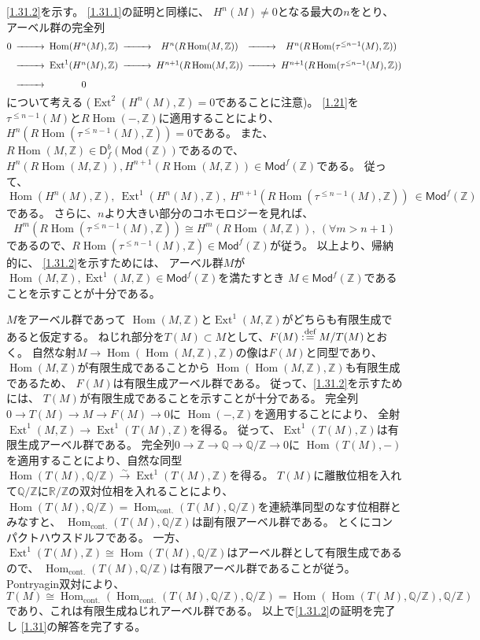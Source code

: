 \documentclass[uplatex,dvipdfmx]{jsarticle}
\makeatletter
\theoremstyle{definition}
\renewenvironment{proof}[1][\proofname]{
  \pushQED{\qed}%
  \normalfont \topsep6\p@\@plus6\p@\relax
  \trivlist
  \item[\hskip\labelsep
    #1\@addpunct{\textbf{.}}]\ignorespaces
}{%
  \popQED\endtrivlist\@endpefalse
}
\providecommand{\proofname}{証明}
\DeclareMathOperator{\Hom}{\mathrm{Hom}}
\DeclareMathOperator{\Ext}{\mathrm{Ext}}
\newcommand{\Mod}{\mathsf{Mod}}
\newcommand{\sfD}{\mathsf{D}}
\newcommand\R{\mathbb{R}}
\newcommand\Q{\mathbb{Q}}
\newcommand\Z{\mathbb{Z}}
\def\dfn{:\overset{\mbox{{\scriptsize def}}}{=}}
\makeatother
\begin{document}
\begin{proof}
  \ref{1.31.2}を示す。
  \ref{1.31.1}の証明と同様に、
  \(H^n(M) \neq 0\)となる最大の\(n\)をとり、
  アーベル群の完全列
  \[
  \begin{CD}
    0 @>>> \Hom(H^n(M),\Z) @>>> H^n(R\Hom(M,\Z))
    @>>> H^n(R\Hom(\tau^{\leq n-1}(M),\Z)) \\
    @>>> \Ext^1(H^n(M),\Z) @>>> H^{n+1}(R\Hom(M,\Z)) @>>>
    H^{n+1}(R\Hom(\tau^{\leq n-1}(M),\Z)) \\
    @>>> 0 @. @.
  \end{CD}
  \]
  について考える
  (\(\Ext^2(H^n(M),\Z)=0\)であることに注意)。
  \autoref{1.21}を\(\tau^{\leq n-1}(M)\)と\(R\Hom(-,\Z)\)に適用することにより、
  \(H^n(R\Hom(\tau^{\leq n-1}(M),\Z)) = 0\)である。
  また、\(R\Hom(M,\Z)\in \sfD_f^b(\Mod(\Z))\)であるので、
  \(H^n(R\Hom(M,\Z)), H^{n+1}(R\Hom(M,\Z))\in \Mod^f(\Z)\)である。
  従って、
  \[\Hom(H^n(M),\Z), \ \Ext^1(H^n(M),\Z), \
  H^{n+1}(R\Hom(\tau^{\leq n-1}(M),\Z)) \ \in \Mod^f(\Z)\]
  である。
  さらに、\(n\)より大きい部分のコホモロジーを見れば、
  \[H^m(R\Hom(\tau^{\leq n-1}(M),\Z))\cong H^m(R\Hom(M,\Z)), \ (\forall m > n+1)\]
  であるので、\(R\Hom(\tau^{\leq n-1}(M),\Z)\in \Mod^f(\Z)\)が従う。
  以上より、帰納的に、
  \ref{1.31.2}を示すためには、
  アーベル群\(M\)が\(\Hom(M,\Z),\Ext^1(M,\Z)\in \Mod^f(\Z)\)を満たすとき
  \(M\in \Mod^f(\Z)\)であることを示すことが十分である。

  \(M\)をアーベル群であって
  \(\Hom(M,\Z)\)と\(\Ext^1(M,\Z)\)がどちらも有限生成であると仮定する。
  ねじれ部分を\(T(M)\subset M\)として、\(F(M)\dfn M/T(M)\)とおく。
  自然な射\(M\to \Hom(\Hom(M,\Z),\Z)\)の像は\(F(M)\)と同型であり、
  \(\Hom(M,\Z)\)が有限生成であることから
  \(\Hom(\Hom(M,\Z),\Z)\)も有限生成であるため、
  \(F(M)\)は有限生成アーベル群である。
  従って、\ref{1.31.2}を示すためには、
  \(T(M)\)が有限生成であることを示すことが十分である。
  完全列
  \(0\to T(M)\to M\to F(M)\to 0\)に
  \(\Hom(-,\Z)\)を適用することにより、
  全射\(\Ext^1(M,\Z)\to \Ext^1(T(M),\Z)\)を得る。
  従って、\(\Ext^1(T(M),\Z)\)は有限生成アーベル群である。
  完全列\(0\to \Z\to \Q\to \Q/\Z\to 0\)に
  \(\Hom(T(M),-)\)を適用することにより、自然な同型
  \(\Hom(T(M),\Q/\Z)\xrightarrow{\sim}\Ext^1(T(M),\Z)\)を得る。
  \(T(M)\)に離散位相を入れて\(\Q/\Z\)に\(\R/\Z\)の双対位相を入れることにより、
  \(\Hom(T(M),\Q/\Z) = \Hom_{\text{cont.}}(T(M),\Q/\Z)\)を連続準同型のなす位相群とみなすと、
  \(\Hom_{\text{cont.}}(T(M),\Q/\Z)\)は副有限アーベル群である。
  とくにコンパクトハウスドルフである。
  一方、\(\Ext^1(T(M),\Z)\cong \Hom(T(M),\Q/\Z)\)はアーベル群として有限生成であるので、
  \(\Hom_{\text{cont.}}(T(M),\Q/\Z)\)は有限アーベル群であることが従う。
  Pontryagin双対により、
  \(T(M)\cong \Hom_{\text{cont.}}(\Hom_{\text{cont.}}(T(M),\Q/\Z),\Q/\Z)
  = \Hom(\Hom(T(M),\Q/\Z),\Q/\Z)\)
  であり、これは有限生成ねじれアーベル群である。
  以上で\ref{1.31.2}の証明を完了し
  \autoref{1.31}の解答を完了する。
\end{proof}
\end{document}
